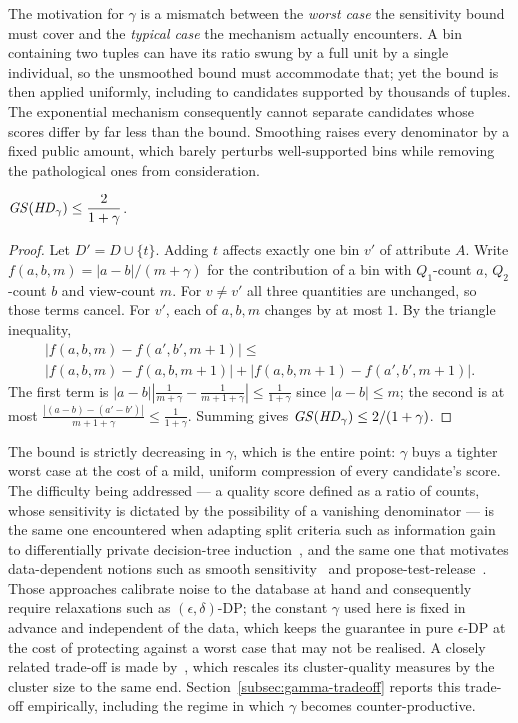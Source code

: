 The motivation for $\gamma$ is a mismatch between the \emph{worst case} the sensitivity bound must cover and the \emph{typical case} the mechanism actually encounters.
A bin containing two tuples can have its ratio swung by a full unit by a single individual, so the unsmoothed bound must accommodate that; yet the bound is then applied uniformly, including to candidates supported by thousands of tuples.
The exponential mechanism consequently cannot separate candidates whose scores differ by far less than the bound.
Smoothing raises every denominator by a fixed public amount, which barely perturbs well-supported bins while removing the pathological ones from consideration.

\begin{proposition}
\label{prop:hd-sensitivity}
$\mathit{GS}(\mathit{HD}_\gamma)\le \dfrac{2}{1+\gamma}$.
\end{proposition}

\begin{proof}
Let $D'=D\cup\{t\}$.
Adding $t$ affects exactly one bin $v'$ of attribute $A$.
Write $f(a,b,m)=|a-b|/(m+\gamma)$ for the contribution of a bin with $Q_1$-count $a$, $Q_2$-count $b$ and view-count $m$.
For $v\neq v'$ all three quantities are unchanged, so those terms cancel.
For $v'$, each of $a,b,m$ changes by at most $1$. By the triangle inequality,
\begin{multline*}
|f(a,b,m)-f(a',b',m{+}1)| \le\\
|f(a,b,m)-f(a,b,m{+}1)| + |f(a,b,m{+}1)-f(a',b',m{+}1)|.
\end{multline*}
The first term is $|a-b|\left|\tfrac{1}{m+\gamma}-\tfrac{1}{m+1+\gamma}\right| \le \tfrac{1}{1+\gamma}$ since $|a-b|\le m$; the second is at most $\tfrac{|(a-b)-(a'-b')|}{m+1+\gamma}\le \tfrac{1}{1+\gamma}$.
Summing gives $\mathit{GS}(\mathit{HD}_\gamma)\le 2/(1+\gamma)$.
\end{proof}

The bound is strictly decreasing in $\gamma$, which is the entire point: $\gamma$ buys a tighter worst case at the cost of a mild, uniform compression of every candidate's score.
The difficulty being addressed --- a quality score defined as a ratio of counts, whose sensitivity is dictated by the possibility of a vanishing denominator --- is the same one encountered when adapting split criteria such as information gain to differentially private decision-tree induction~\cite{FriedmanSchuster10}, and the same one that motivates data-dependent notions such as smooth sensitivity~\cite{NissimRS07} and propose-test-release~\cite{DworkLei09}.
Those approaches calibrate noise to the database at hand and consequently require relaxations such as $(\epsilon,\delta)$-DP; the constant $\gamma$ used here is fixed in advance and independent of the data, which keeps the guarantee in pure $\epsilon$-DP at the cost of protecting against a worst case that may not be realised.
A closely related trade-off is made by~\cite{DPClustX}, which rescales its cluster-quality measures by the cluster size to the same end.
Section~\ref{subsec:gamma-tradeoff} reports this trade-off empirically, including the regime in which $\gamma$ becomes counter-productive.

